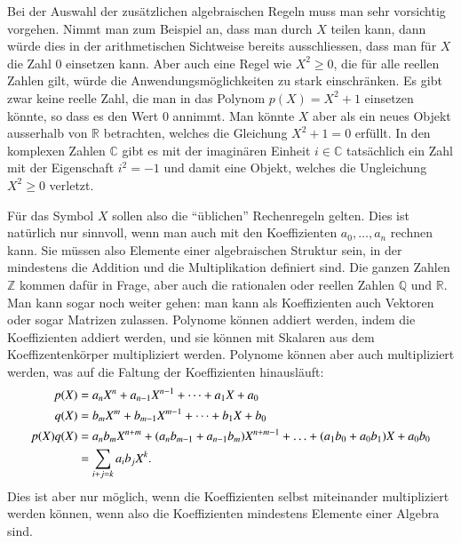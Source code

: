 Bei der Auswahl der zusätzlichen algebraischen Regeln muss man sehr
vorsichtig vorgehen.
Nimmt man zum Beispiel an, dass man durch $X$ teilen kann, dann würde
dies in der arithmetischen Sichtweise bereits ausschliessen, dass man
für $X$ die Zahl $0$ einsetzen kann.
Aber auch eine Regel wie $X^2 \ge 0$, die für alle reellen Zahlen gilt,
würde die Anwendungsmöglichkeiten zu stark einschränken.
Es gibt zwar keine reelle Zahl, die man in das Polynom $p(X)=X^2+1$
einsetzen könnte, so dass es den Wert $0$ annimmt.
Man könnte $X$ aber als ein neues Objekt ausserhalb von $\mathbb{R}$
betrachten, welches die Gleichung $X^2+1=0$ erfüllt.
In den komplexen Zahlen $\mathbb{C}$ gibt es mit der imaginären
Einheit $i\in\mathbb{C}$ tatsächlich ein Zahl mit der Eigenschaft
$i^2=-1$ und damit eine Objekt, welches die Ungleichung $X^2\ge 0$
verletzt.

Für das Symbol $X$ sollen also die ``üblichen'' Rechenregeln gelten.
Dies ist natürlich nur sinnvoll, wenn man auch mit den Koeffizienten
$a_0,\dots,a_n$ rechnen kann.
Sie müssen also Elemente einer
algebraischen Struktur sein, in der mindestens die Addition und die
Multiplikation definiert sind.
Die ganzen Zahlen $\mathbb{Z}$ kommen dafür in Frage, aber auch
die rationalen oder reellen Zahlen $\mathbb{Q}$ und $\mathbb{R}$.
Man kann sogar noch weiter gehen: man kann als Koeffizienten auch
Vektoren oder sogar Matrizen zulassen.
Polynome können addiert werden, indem die Koeffizienten addiert werden,
und sie können mit Skalaren aus dem Koeffizentenkörper multipliziert werden.
Polynome können aber auch multipliziert werden, was auf die Faltung
der Koeffizienten hinausläuft:
\begin{align}
p(X) &= a_nX^n + a_{n-1}X^{n-1} + \dots + a_1X + a_0
\notag
\\
q(X) &= b_mX^m + b_{m-1}X^{m-1} + \dots + b_1X + b_0
\notag
\\
p(X) q(X) &=
a_{n}b_{m}X^{n+m}
+
(a_{n}b_{m-1}+a_{n-1}b_{m})X^{n+m-1}
+
\ldots
+
(a_1b_0+a_0b_1)X
+
a_0b_0
\\
&=
\sum_{i + j = k}a_ib_j X^k.
\notag
\label{buch:eqn:polynome:faltung}
\end{align}
Dies ist aber nur möglich, wenn die Koeffizienten selbst miteinander
multipliziert werden können, wenn also die Koeffizienten mindestens
Elemente einer Algebra sind.



%
%


